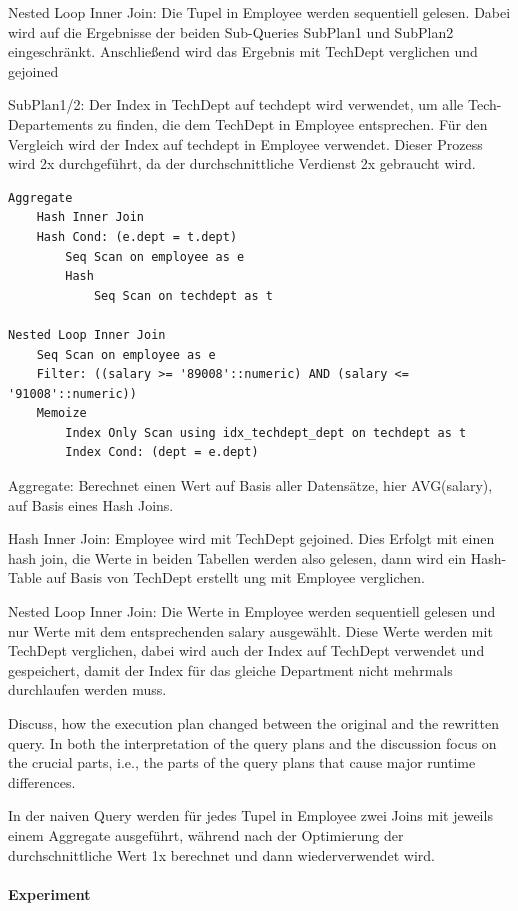 \documentclass[11pt]{scrartcl}
\begin{document}
Nested Loop Inner Join: Die Tupel in Employee werden sequentiell gelesen. Dabei wird auf die Ergebnisse der beiden Sub-Queries SubPlan1 und SubPlan2 eingeschränkt. Anschließend wird das Ergebnis mit TechDept verglichen und gejoined

SubPlan1/2: Der Index in TechDept auf techdept wird verwendet, um alle Tech-Departements zu finden, die dem TechDept in Employee entsprechen. Für den Vergleich wird der Index auf techdept in Employee verwendet. Dieser Prozess wird 2x durchgeführt, da der durchschnittliche Verdienst 2x gebraucht wird.

{\small
\parskip0pt\begin{verbatim}
Aggregate
	Hash Inner Join
	Hash Cond: (e.dept = t.dept)
		Seq Scan on employee as e
		Hash
			Seq Scan on techdept as t

Nested Loop Inner Join
	Seq Scan on employee as e
	Filter: ((salary >= '89008'::numeric) AND (salary <= '91008'::numeric))
	Memoize
		Index Only Scan using idx_techdept_dept on techdept as t
		Index Cond: (dept = e.dept)
\end{verbatim}}

Aggregate: Berechnet einen Wert auf Basis aller Datensätze, hier AVG(salary), auf Basis eines Hash Joins.

Hash Inner Join: Employee wird mit TechDept gejoined. Dies Erfolgt mit einen hash join, die Werte in beiden Tabellen werden also gelesen, dann wird ein Hash-Table auf Basis von TechDept erstellt ung mit Employee verglichen.

Nested Loop Inner Join: Die Werte in Employee werden sequentiell gelesen und nur Werte mit dem entsprechenden salary ausgewählt. Diese Werte werden mit TechDept verglichen, dabei wird auch der Index auf TechDept verwendet und gespeichert, damit der Index für das gleiche Department nicht mehrmals durchlaufen werden muss.

Discuss, how the execution plan changed between the original and the rewritten query. In both the interpretation of the query plans and the discussion focus on the crucial parts, i.e., the parts of the query plans that cause major runtime differences.

In der naiven Query werden für jedes Tupel in Employee zwei Joins mit jeweils einem Aggregate ausgeführt, während nach der Optimierung der durchschnittliche Wert 1x berechnet und dann wiederverwendet wird.

\paragraph{Experiment}
\end{document}
